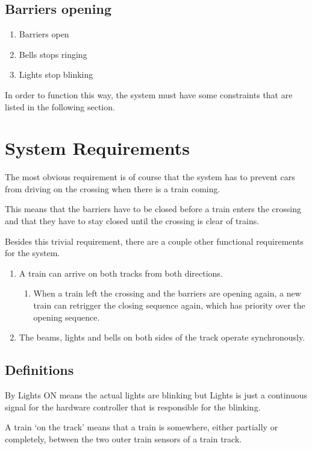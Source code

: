 \documentclass[final]{report}
\begin{document}
\subsection{Barriers opening}
\begin{enumerate}
\item Barriers open
\item Bells stops ringing
\item Lights stop blinking
\end{enumerate}

In order to function this way, the system must have some constraints that are listed in the following section. 

\section{System Requirements}
The most obvious requirement is of course that the system has to prevent cars from driving on the crossing when there is a train coming.

This means that the barriers have to be closed before a train enters the crossing and that they have to stay closed until the crossing is clear of trains.

Besides this trivial requirement, there are a couple other functional requirements for the system.

\begin{enumerate}
\item A train can arrive on both tracks from both directions.
	\begin{enumerate}
	\item When a train left the crossing and the barriers are opening again, a new train can retrigger the closing sequence again, which has priority over the opening sequence.
	\end{enumerate}

\item The beams, lights and bells on both sides of the track operate synchronously.
\end{enumerate}

\subsection{Definitions}
By Lights ON means the actual lights are blinking but Lights is just a continuous signal for the hardware controller that is responsible for the blinking.

A train `on the track' means that a train is somewhere, either partially or completely, between the two outer train sensors of a train track.
\end{document}
